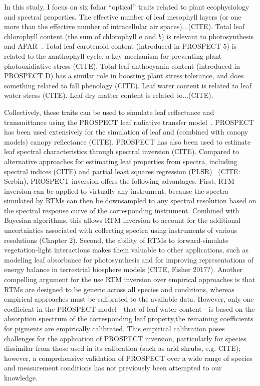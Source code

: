 In this study, I focus on six foliar ``optical'' traits related to plant ecophysiology and spectral properties.
The effective number of leaf mesophyll layers (or one more than the effective number of intracellular air spaces)...(CITE).
Total leaf chlorophyll content (the sum of chlorophyll $a$ and $b$) is relevant to photosynthesis and APAR~\cite{croft_2017_chlorophyll}.
Total leaf carotenoid content (introduced in PROSPECT 5) is related to the xanthophyll cycle, a key mechanism for preventing plant photooxidiative stress (CITE).
Total leaf anthocyanin content (introduced in PROSPECT D) has a similar role in boosting plant stress tolerance, and does something related to fall phenology (CITE).
Leaf water content is related to leaf water stress (CITE).
Leaf dry matter content is related to...(CITE).

Collectively, these traits can be used to simulate leaf reflectance and transmittance using the PROSPECT leaf radiative transfer model~\cite{jacquemoud1990_prospect,feret2008_prospect,feret2017_prospectd}.
PROSPECT has been used extensively for the simulation of leaf and (combined with canopy models) canopy reflectance (CITE).
PROSPECT has also been used to estimate leaf spectral characteristics through spectral inversion (CITE).
Compared to alternative approaches for estimating leaf properties from spectra, including spectral indices (CITE) and partial least squares regression (PLSR)~\cite{barnes_2017_beyond} (CITE: Serbin), PROSPECT inversion offers the following advantages.
First, RTM inversion can be applied to virtually any instrument, because the spectra simulated by RTMs can then be downsampled to any spectral resolution based on the spectral response curve of the corresponding instrument.
Combined with Bayesian algorithms, this allows RTM inversion to account for the additional uncertainties associated with collecting spectra using instruments of various resolutions (Chapter 2).
Second, the ability of RTMs to forward-simulate vegetation-light interactions makes them valuable to other applications, such as modeling leaf absorbance for photosynthesis and for improving representations of energy balance in terrestrial biosphere models (CITE, Fisher 2017?).
Another compelling argument for the use RTM inversion over empirical approaches is that RTMs are designed to be generic across all species and conditions, whereas empirical approaches must be calibrated to the available data.
However, only one coefficient in the PROSPECT model---that of leaf water content---is based on the absorption spectrum of the corresponding leaf property,the remaining coefficients for pigments are empirically calibrated.
This empirical calibration poses challenges for the application of PROSPECT inversion, particularly for species dissimilar from those used in its calibration (such as arid shrubs, e.g. CITE); however, a comprehensive validation of PROSPECT over a wide range of species and measurement conditions has not previously been attempted to our knowledge.

